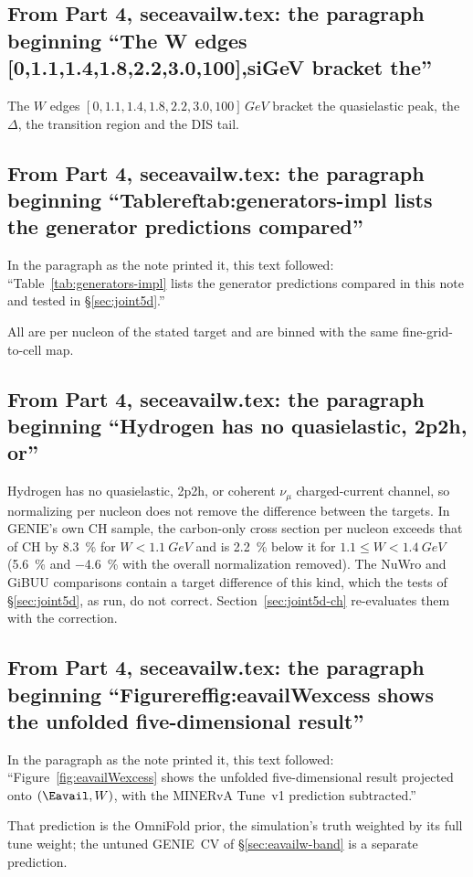 \subsection{From Part 4, seceavailw.tex: the paragraph beginning ``The W edges [0,1.1,1.4,1.8,2.2,3.0,100],siGeV bracket the''}
The $W$ edges $[0,1.1,1.4,1.8,2.2,3.0,100]\,\si{GeV}$ bracket the quasielastic peak, the $\Delta$, the transition region and the DIS tail.

\subsection{From Part 4, seceavailw.tex: the paragraph beginning ``Tablereftab:generators-impl lists the generator predictions compared''}
In the paragraph as the note printed it, this text followed: ``Table~\ref{tab:generators-impl} lists the generator predictions compared in this note and tested in \S\ref{sec:joint5d}.''\par
All are per nucleon of the stated target and are binned with the same fine-grid-to-cell map.

\subsection{From Part 4, seceavailw.tex: the paragraph beginning ``Hydrogen has no quasielastic, 2p2h, or''}
Hydrogen has no quasielastic, 2p2h, or coherent $\nu_{\mu}$ charged-current channel, so normalizing per nucleon does not remove the difference between the targets.  In GENIE's own CH sample, the carbon-only cross section per nucleon exceeds that of CH by \SI{8.3}{\percent} for $W<\SI{1.1}{GeV}$ and is \SI{2.2}{\percent} below it for $1.1\le W<\SI{1.4}{GeV}$ (\SI{+5.6}{\percent} and \SI{-4.6}{\percent} with the overall normalization removed).  The NuWro and GiBUU comparisons contain a target difference of this kind, which the tests of \S\ref{sec:joint5d}, as run, do not correct. Section~\ref{sec:joint5d-ch} re-evaluates them with the correction.

\subsection{From Part 4, seceavailw.tex: the paragraph beginning ``Figurereffig:eavailWexcess shows the unfolded five-dimensional result''}
In the paragraph as the note printed it, this text followed: ``Figure~\ref{fig:eavailWexcess} shows the unfolded five-dimensional result projected onto $(\Eavail,W)$, with the MINERvA Tune~v1 prediction subtracted.''\par
That prediction is the OmniFold prior, the simulation's truth weighted by its full tune weight; the untuned GENIE~CV of \S\ref{sec:eavailw-band} is a separate prediction.

